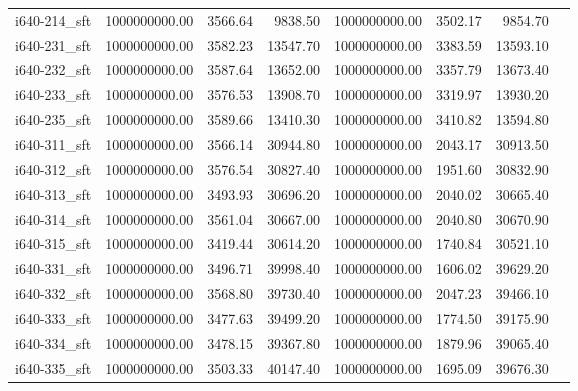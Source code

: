 \begin{tabular}{llrrrrrr}
i640-214\_sft &           1000000000.00 &                     3566.64 &               9838.50 &    1000000000.00 &              3502.17 &        9854.70 \\
i640-231\_sft &           1000000000.00 &                     3582.23 &              13547.70 &    1000000000.00 &              3383.59 &       13593.10 \\
i640-232\_sft &           1000000000.00 &                     3587.64 &              13652.00 &    1000000000.00 &              3357.79 &       13673.40 \\
i640-233\_sft &           1000000000.00 &                     3576.53 &              13908.70 &    1000000000.00 &              3319.97 &       13930.20 \\
i640-235\_sft &           1000000000.00 &                     3589.66 &              13410.30 &    1000000000.00 &              3410.82 &       13594.80 \\
i640-311\_sft &           1000000000.00 &                     3566.14 &              30944.80 &    1000000000.00 &              2043.17 &       30913.50 \\
i640-312\_sft &           1000000000.00 &                     3576.54 &              30827.40 &    1000000000.00 &              1951.60 &       30832.90 \\
i640-313\_sft &           1000000000.00 &                     3493.93 &              30696.20 &    1000000000.00 &              2040.02 &       30665.40 \\
i640-314\_sft &           1000000000.00 &                     3561.04 &              30667.00 &    1000000000.00 &              2040.80 &       30670.90 \\
i640-315\_sft &           1000000000.00 &                     3419.44 &              30614.20 &    1000000000.00 &              1740.84 &       30521.10 \\
i640-331\_sft &           1000000000.00 &                     3496.71 &              39998.40 &    1000000000.00 &              1606.02 &       39629.20 \\
i640-332\_sft &           1000000000.00 &                     3568.80 &              39730.40 &    1000000000.00 &              2047.23 &       39466.10 \\
i640-333\_sft &           1000000000.00 &                     3477.63 &              39499.20 &    1000000000.00 &              1774.50 &       39175.90 \\
i640-334\_sft &           1000000000.00 &                     3478.15 &              39367.80 &    1000000000.00 &              1879.96 &       39065.40 \\
i640-335\_sft &           1000000000.00 &                     3503.33 &              40147.40 &    1000000000.00 &              1695.09 &       39676.30 \\
\bottomrule
\end{tabular}
